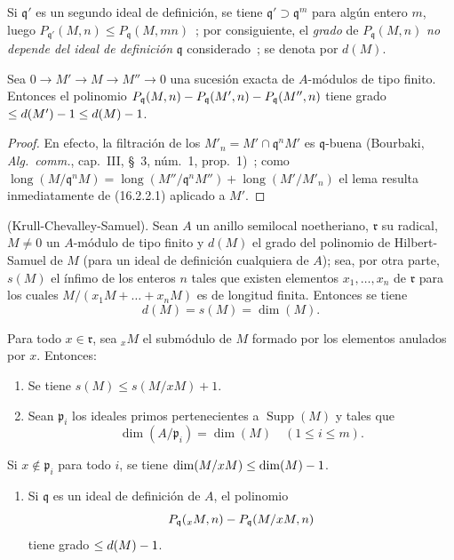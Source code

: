 Si $\mathfrak{q}'$ es un segundo ideal de definición, se tiene
$\mathfrak{q}'\supset\mathfrak{q}^m$ para algún entero $m$, luego
$P_{\mathfrak{q}'}(M,n)\leq P_{\mathfrak{q}}(M,mn)$~; por consiguiente, el
\emph{grado} de $P_{\mathfrak{q}}(M,n)$ \emph{no depende del ideal de definición}
$\mathfrak{q}$ considerado~; se denota por $d(M)$.

\begin{lemma}[16.2.2.2]
\label{0.16.2.2.2-fr}
Sea $0\to M'\to M\to M''\to0$ una sucesión exacta de $A$-módulos de tipo
finito. Entonces el polinomio
$P_{\mathfrak{q}}(M,n)- P_{\mathfrak{q}}(M',n)- P_{\mathfrak{q}}(M'',n)$
tiene grado $\leq d(M')- 1\leq d(M)- 1$.
\end{lemma}

\begin{proof}
En efecto, la filtración de los
$M'_n=M'\cap\mathfrak{q}^nM'$ es $\mathfrak{q}$-buena (Bourbaki,
\emph{Alg.~comm.}, cap.~III, \S~3, núm.~1, prop.~1)~; como
$\operatorname{long}(M/\mathfrak{q}^nM)=\operatorname{long}(M''/\mathfrak{q}^nM'')+\operatorname{long}(M'/M'_n)$
el lema resulta inmediatamente de (16.2.2.1) aplicado a $M'$.
\end{proof}

\begin{theorem}[16.2.3]
\label{0.16.2.3-fr}
\textup{(Krull-Chevalley-Samuel).}
Sean $A$ un anillo semilocal noetheriano, $\mathfrak{r}$ su radical,
$M\neq0$ un $A$-módulo de tipo finito y $d(M)$ el grado del polinomio de
Hilbert-Samuel de $M$ (para un ideal de definición cualquiera de $A$); sea,
por otra parte, $s(M)$ el ínfimo de los enteros $n$ tales que existen elementos
$x_1,\ldots,x_n$ de $\mathfrak{r}$ para los cuales
$M/(x_1M+\ldots+x_nM)$ es de longitud finita. Entonces se tiene
\[
  d(M)=s(M)=\dim(M).
\]
\end{theorem}

\begin{lemma}[16.2.3.1]
\label{0.16.2.3.1-fr}
Para todo $x\in\mathfrak{r}$, sea ${}_xM$ el submódulo de $M$ formado por los
elementos anulados por $x$. Entonces:
\begin{enumerate}
  \item[\rm{(i)}] Se tiene $s(M)\leq s(M/xM)+1$.
  \item[\rm{(ii)}] Sean $\mathfrak{p}_i$ los ideales primos pertenecientes a
  $\operatorname{Supp}(M)$ y tales que
  \[
    \dim(A/\mathfrak{p}_i)=\dim(M)\quad(1\leq i\leq m).
  \]
\end{enumerate}
Si $x\notin\mathfrak{p}_i$ para todo $i$, se tiene
$\dim(M/xM)\leq\dim(M)- 1$.
\begin{enumerate}
  \item[\rm{(iii)}] Si $\mathfrak{q}$ es un ideal de definición de $A$, el
  polinomio
  \[
    P_{\mathfrak{q}}({}_xM,n)- P_{\mathfrak{q}}(M/xM,n)
  \]
  tiene grado $\leq d(M)- 1$.
\end{enumerate}
\end{lemma}

